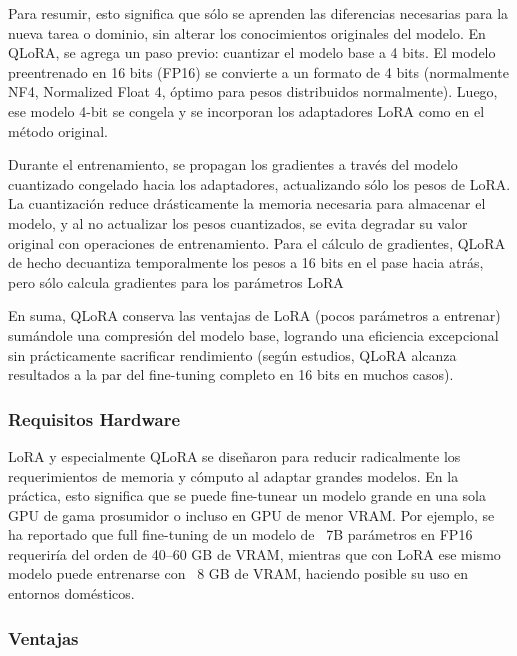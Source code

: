 Para resumir, esto significa que sólo se aprenden las diferencias necesarias para la nueva tarea o dominio, sin alterar los conocimientos originales del modelo. En QLoRA, se agrega un paso previo: cuantizar el modelo base a 4 bits.\cite{HuggingFace-LoRA} El modelo preentrenado en 16 bits (FP16) se convierte a un formato de 4 bits (normalmente NF4, Normalized Float 4, óptimo para pesos distribuidos normalmente). Luego, ese modelo 4-bit se congela y se incorporan los adaptadores LoRA como en el método original.

Durante el entrenamiento, se propagan los gradientes a través del modelo cuantizado congelado hacia los adaptadores, actualizando sólo los pesos de LoRA. La cuantización reduce drásticamente la memoria necesaria para almacenar el modelo, y al no actualizar los pesos cuantizados, se evita degradar su valor original con operaciones de entrenamiento. Para el cálculo de gradientes, QLoRA de hecho decuantiza temporalmente los pesos a 16 bits en el pase hacia atrás, pero sólo calcula gradientes para los parámetros LoRA\cite{HuggingFace-LoRA}

En suma, QLoRA conserva las ventajas de LoRA (pocos parámetros a entrenar) sumándole una compresión del modelo base, logrando una eficiencia excepcional sin prácticamente sacrificar rendimiento (según estudios, QLoRA alcanza resultados a la par del fine-tuning completo en 16 bits en muchos casos).\cite{HuggingFace-LoRA}

\subsubsection{Requisitos Hardware}
LoRA y especialmente QLoRA se diseñaron para reducir radicalmente los requerimientos de memoria y cómputo al adaptar grandes modelos. En la práctica, esto significa que se puede fine-tunear un modelo grande en una sola GPU de gama prosumidor o incluso en GPU de menor VRAM. Por ejemplo, se ha reportado que full fine-tuning de un modelo de ~7B parámetros en FP16 requeriría del orden de 40–60 GB de VRAM, mientras que con LoRA ese mismo modelo puede entrenarse con ~8 GB de VRAM, haciendo posible su uso en entornos domésticos.\cite{Gpu-Finetuning}

\subsubsection{Ventajas}

